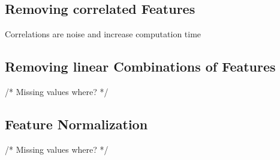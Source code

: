 \subsection{Removing correlated Features } \label{Ch:2:RCF}
Correlations are noise and increase computation time
\subsection{Removing linear Combinations of Features}\label{Ch:2:RLCOF} /* Missing values where? */
\subsection{Feature Normalization}\label{Ch:2:FN} /* Missing values where? */


